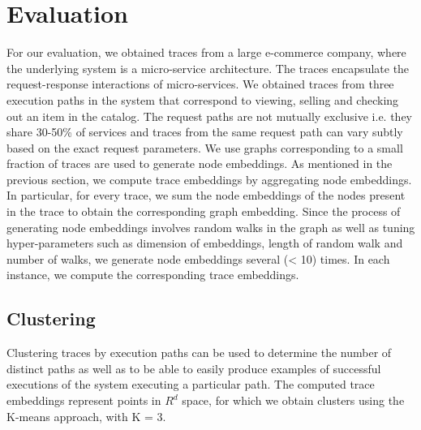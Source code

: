 \section{Evaluation}
For our evaluation, we obtained traces from a large e-commerce company, where the underlying system is a micro-service architecture. The traces encapsulate the request-response interactions of micro-services. We obtained traces from three execution paths in the system that correspond to viewing, selling and checking out an item in the catalog. The request paths are not mutually exclusive i.e. they share 30-50\%  of services and traces from the same request path can vary subtly based on the exact request parameters. We use graphs corresponding to a small fraction of traces are used to generate node embeddings. As mentioned in the previous section, we compute trace embeddings by aggregating node embeddings. In particular, for every trace, we sum the node embeddings of the nodes present in the trace to obtain the corresponding graph embedding. Since the process of generating node embeddings involves random walks in the graph as well as tuning hyper-parameters such as dimension of embeddings, length of random walk and number of walks, we generate node embeddings several (< 10) times. In each instance, we compute the corresponding trace embeddings. 

  
\subsection{Clustering}
 Clustering traces by execution paths can be used to determine the number of distinct paths as well as to be able to easily produce examples of successful executions of the system executing a particular path. The computed trace embeddings represent points in $R^{d}$ space, for which we obtain clusters using the K-means approach, with K = 3. 
 
